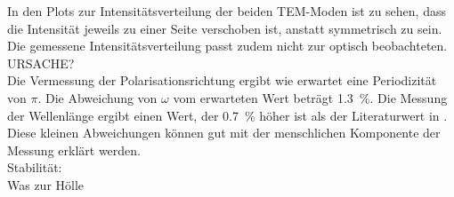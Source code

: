 In den Plots zur Intensitätsverteilung der beiden TEM-Moden ist zu sehen, dass die Intensität jeweils zu einer Seite verschoben ist, anstatt symmetrisch zu sein. Die gemessene Intensitätsverteilung passt zudem nicht zur optisch beobachteten. URSACHE? \\
Die Vermessung der Polarisationsrichtung ergibt wie erwartet eine Periodizität von $\pi$. Die Abweichung von $\omega$ vom erwarteten Wert beträgt \SI{1.3}{\%}. Die Messung der Wellenlänge ergibt einen Wert, der \SI{0.7}{\%} höher ist als der Literaturwert in \cite{V61}. Diese kleinen Abweichungen können gut mit der menschlichen Komponente der Messung erklärt werden. \\
Stabilität: \\
Was zur Hölle